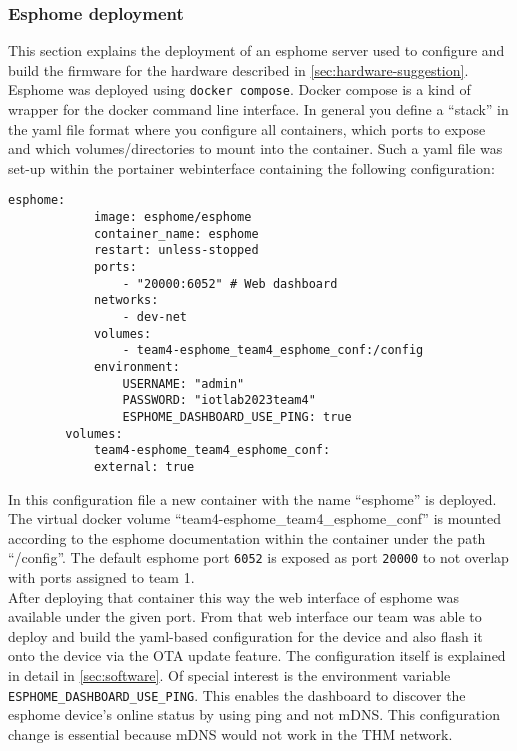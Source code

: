 	\subsubsection{Esphome deployment}
	\label{sec:esphome-container}
		This section explains the deployment of an esphome server used to configure and build the firmware for the hardware described in \cref{sec:hardware-suggestion}. Esphome was deployed using \texttt{docker compose}. Docker compose is a kind of wrapper for the docker command line interface. In general you define a \enquote{stack} in the \ac{yaml} file format where you configure all containers, which ports to expose and which volumes/directories to mount into the container. Such a yaml file was set-up within the portainer webinterface containing the following configuration:
		
		\begin{lstlisting}[tabsize=2, gobble=4, caption={docker-compose.yml configuration for esphome container}, label=lst:esphome]
		esphome:
			image: esphome/esphome
			container_name: esphome
			restart: unless-stopped
			ports:
				- "20000:6052" # Web dashboard
			networks:
				- dev-net
			volumes:
				- team4-esphome_team4_esphome_conf:/config
			environment:
				USERNAME: "admin"
				PASSWORD: "iotlab2023team4"
				ESPHOME_DASHBOARD_USE_PING: true
		volumes:
			team4-esphome_team4_esphome_conf:
			external: true
		\end{lstlisting}
		
		In this configuration file a new container with the name \enquote{esphome} is deployed. The virtual docker volume \enquote{team4-esphome\_team4\_esphome\_conf} is mounted according to the esphome documentation within the container under the path \enquote{/config}. The default esphome port \texttt{6052} is exposed as port \texttt{20000} to not overlap with ports assigned to team 1.\\
		After deploying that container this way the web interface of esphome was available under the given port. From that web interface our team was able to deploy and build the yaml-based configuration for the device and also flash it onto the device via the \ac{OTA} update feature. The configuration itself is explained in detail in \cref{sec:software}. Of special interest is the environment variable \texttt{ESPHOME\_DASHBOARD\_USE\_PING}. This enables the dashboard to discover the esphome device's online status by using ping and not \ac{mDNS}. This configuration change is essential because \ac{mDNS} would not work in the THM network.
		
